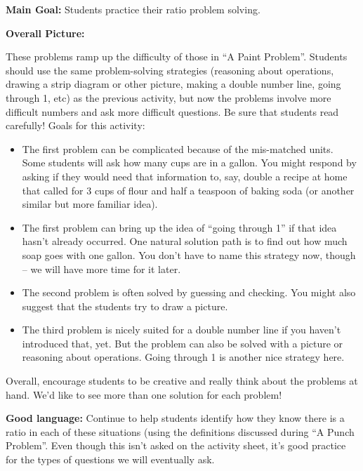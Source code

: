 \documentclass{ximera}
\begin{document}
\newpage
\begin{instructorNotes}

{\bf Main Goal:} Students practice their ratio problem solving.

{\bf Overall Picture:}

These problems ramp up the difficulty of those in ``A Paint Problem''. Students should use the same problem-solving strategies (reasoning about operations, drawing a strip diagram or other picture, making a double number line, going through 1, etc) as the previous activity, but now the problems involve more difficult numbers and ask more difficult questions. Be sure that students read carefully!
Goals for this activity:
\begin{itemize}
    \item The first problem can be complicated because of the mis-matched units. Some students will ask how many cups are in a gallon. You might respond by asking if they would need that information to, say, double a recipe at home that called for 3 cups of flour and half a teaspoon of baking soda (or another similar but more familiar idea).
    \item The first problem can bring up the idea of ``going through 1'' if that idea hasn't already occurred. One natural solution path is to find out how much soap goes with one gallon. You don't have to name this strategy now, though -- we will have more time for it later.
    \item The second problem is often solved by guessing and checking. You might also suggest that the students try to draw a picture.
    \item The third problem is nicely suited for a double number line if you haven't introduced that, yet. But the problem can also be solved with a picture or reasoning about operations. Going through 1 is another nice strategy here. 
\end{itemize}

Overall, encourage students to be creative and really think about the problems at hand. We'd like to see more than one solution for each problem!

{\bf Good language:} Continue to help students identify how they know there is a ratio in each of these situations (using the definitions discussed during ``A Punch Problem''. Even though this isn't asked on the activity sheet, it's good practice for the types of questions we will eventually ask.




\end{instructorNotes}
\end{document}
